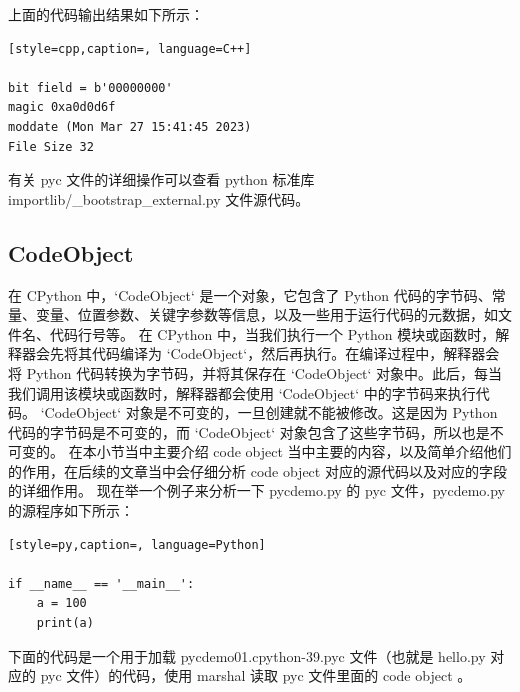 上面的代码输出结果如下所示：
\begin{lstlisting}[style=cpp,caption=, language=C++]

bit field = b'00000000'
magic 0xa0d0d6f
moddate (Mon Mar 27 15:41:45 2023)
File Size 32
\end{lstlisting}
有关 pyc 文件的详细操作可以查看 python 标准库 importlib/\_bootstrap\_external.py 文件源代码。
\subsection{CodeObject}
在 CPython 中，`CodeObject` 是一个对象，它包含了 Python 代码的字节码、常量、变量、位置参数、关键字参数等信息，以及一些用于运行代码的元数据，如文件名、代码行号等。
在 CPython 中，当我们执行一个 Python 模块或函数时，解释器会先将其代码编译为 `CodeObject`，然后再执行。在编译过程中，解释器会将 Python 代码转换为字节码，并将其保存在 `CodeObject` 对象中。此后，每当我们调用该模块或函数时，解释器都会使用 `CodeObject` 中的字节码来执行代码。
`CodeObject` 对象是不可变的，一旦创建就不能被修改。这是因为 Python 代码的字节码是不可变的，而 `CodeObject` 对象包含了这些字节码，所以也是不可变的。
在本小节当中主要介绍 code object 当中主要的内容，以及简单介绍他们的作用，在后续的文章当中会仔细分析 code object 对应的源代码以及对应的字段的详细作用。
现在举一个例子来分析一下 pycdemo.py 的 pyc 文件，pycdemo.py 的源程序如下所示：
\begin{lstlisting}[style=py,caption=, language=Python]

if __name__ == '__main__':
    a = 100
    print(a)
\end{lstlisting}
下面的代码是一个用于加载 pycdemo01.cpython-39.pyc 文件（也就是 hello.py 对应的 pyc 文件）的代码，使用 marshal 读取 pyc 文件里面的 code object 。
